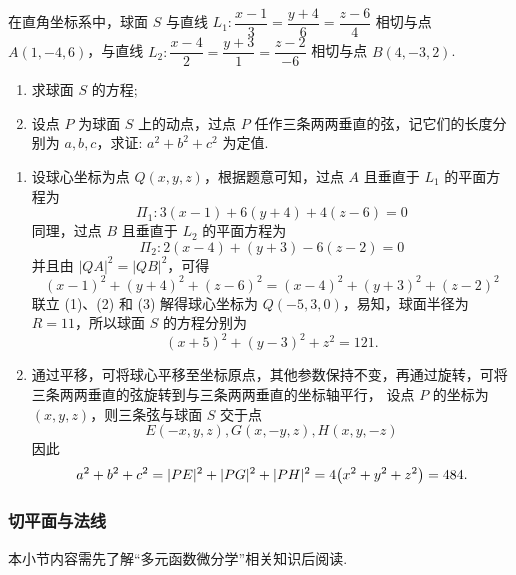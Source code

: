 \begin{example}
    在直角坐标系中，球面 $S$ 与直线 $L_1:\dfrac{x-1}{3}=\dfrac{y+4}{6}=\dfrac{z-6}{4}$ 相切与点 $A(1,-4,6)$，与直线 $L_2:\dfrac{x-4}{2}=\dfrac{y+3}{1}=\dfrac{z-2}{-6}$ 相切与点 $B(4,-3,2)$.
    \begin{enumerate}[label=(\arabic{*})]
        \item 求球面 $S$ 的方程;
        \item 设点 $P$ 为球面 $S$ 上的动点，过点 $P$ 任作三条两两垂直的弦，记它们的长度分别为 $a,b,c$，求证: $a^2+b^2+c^2$ 为定值.
    \end{enumerate}
\end{example}
\begin{solution}
    \begin{enumerate}[label=(\arabic{*})]
        \item 设球心坐标为点 $Q(x,y,z)$，根据题意可知，过点 $A$ 且垂直于 $L_1$ 的平面方程为 
        \begin{equation*}
            \Pi_1:3(x-1)+6(y+4)+4(z-6)=0
            \tag*{(1)}
        \end{equation*}
        同理，过点 $B$ 且垂直于 $L_2$ 的平面方程为 
        \begin{equation*}
            \Pi_2:2(x-4)+(y+3)-6(z-2)=0
            \tag*{(2)}
        \end{equation*}
        并且由 $|QA|^2=|QB|^2$，可得
        \begin{equation*}
            (x-1)^2+(y+4)^2+(z-6)^2=(x-4)^2+(y+3)^2+(z-2)^2
            \tag*{(3)}
        \end{equation*}
        联立 (1)、(2) 和 (3) 解得球心坐标为 $Q(-5,3,0)$，易知，球面半径为 $R=11$，所以球面 $S$ 的方程分别为
        $$(x+5)^2+(y-3)^2+z^2=121.$$
        \item 通过平移，可将球心平移至坐标原点，其他参数保持不变，再通过旋转，可将三条两两垂直的弦旋转到与三条两两垂直的坐标轴平行，
        设点 $P$ 的坐标为 $(x,y,z)$，则三条弦与球面 $S$ 交于点 $$E(-x,y,z),G(x,-y,z),H(x,y,-z)$$
        因此 $$a^2+b^2+c^2=|PE|^2+|PG|^2+|PH|^2=4\qty(x^2+y^2+z^2)=484.$$
    \end{enumerate}
\end{solution}

\subsubsection{切平面与法线}

本小节内容需先了解“多元函数微分学”相关知识后阅读.


